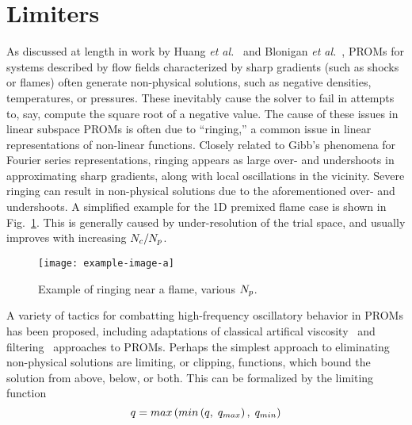 \section{Limiters}

As discussed at length in work by Huang \textit{et al.}~\cite{Huang2019} and Blonigan \textit{et al.}~\cite{Blonigan2020}, PROMs for systems described by flow fields characterized by sharp gradients (such as shocks or flames) often generate non-physical solutions, such as negative densities, temperatures, or pressures. These inevitably cause the solver to fail in attempts to, say, compute the square root of a negative value. The cause of these issues in linear subspace PROMs is often due to ``ringing,'' a common issue in linear representations of non-linear functions. Closely related to Gibb's phenomena for Fourier series representations, ringing appears as large over- and undershoots in approximating sharp gradients, along with local oscillations in the vicinity. Severe ringing can result in non-physical solutions due to the aforementioned over- and undershoots. A simplified example for the 1D premixed flame case is shown in Fig.~\ref{fig:limitRingingEx}. This is generally caused by under-resolution of the trial space, and usually improves with increasing $N_c/N_p$.

\begin{figure}
    \centering
    \texttt{[image: example-image-a]}
    \caption{\label{fig:limitRingingEx}Example of ringing near a flame, various $N_p$.}
\end{figure}

A variety of tactics for combatting high-frequency oscillatory behavior in PROMs has been proposed, including adaptations of classical artifical viscosity~\cite{Sirisup2004,San2013} and filtering~\cite{Ardag2011,Wells2017} approaches to PROMs. Perhaps the simplest approach to eliminating non-physical solutions are limiting, or clipping, functions, which bound the solution from above, below, or both. This can be formalized by the limiting function 
%
\begin{equation}
    q = max\left(min\left(q, \; q_{max}\right), \; q_{min}\right)
\end{equation}
%

